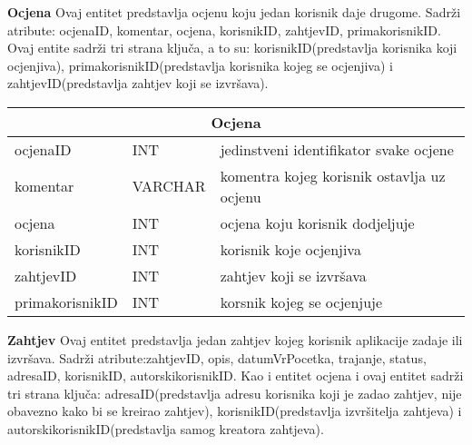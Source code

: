 			\bigskip
			\bigskip
			\textbf{Ocjena} Ovaj entitet predstavlja ocjenu koju jedan korisnik daje drugome. Sadrži atribute: ocjenaID, komentar, ocjena, korisnikID, zahtjevID, primakorisnikID. Ovaj entite sadrži tri strana ključa, a to su: korisnikID(predstavlja korisnika koji ocjenjiva), primakorisnikID(predstavlja korisnika kojeg se ocjenjiva) i zahtjevID(predstavlja zahtjev koji se izvršava).
			\bigskip
			
			\begin{tabularx} {\textwidth} {|p{3.5cm}|p{2cm}|X|}
				
				\hline
				\multicolumn{3}{|c|}{\textbf{Ocjena}} \\
				\hline
				
				\cellcolor{LightGreen}ocjenaID & INT	& jedinstveni identifikator svake ocjene	\\ \hline
				komentar	& VARCHAR &  komentra kojeg korisnik ostavlja uz ocjenu 	\\ \hline 
				ocjena & INT & ocjena koju korisnik dodjeljuje  \\ \hline 
				\cellcolor{LightBlue} korisnikID	& INT &  korisnik koje ocjenjiva 	\\ \hline 
				\cellcolor{LightBlue} zahtjevID	& INT &  zahtjev koji se izvršava 	\\ \hline 
				\cellcolor{LightBlue} primakorisnikID	& INT &  korsnik kojeg se ocjenjuje 	\\ \hline 
				
			\end{tabularx}
			
			\bigskip
			\bigskip
			\textbf{Zahtjev} Ovaj entitet predstavlja jedan zahtjev kojeg korisnik aplikacije zadaje ili izvršava. Sadrži atribute:zahtjevID, opis, datumVrPocetka, trajanje, status, adresaID, korisnikID, autorskikorisnikID. Kao i entitet ocjena i ovaj entitet sadrži tri strana ključa: adresaID(predstavlja adresu korisnika koji je zadao zahtjev, nije obavezno kako bi se kreirao zahtjev), korisnikID(predstavlja izvršitelja zahtjeva) i autorskikorisnikID(predstavlja samog kreatora zahtjeva).
			\bigskip
			
